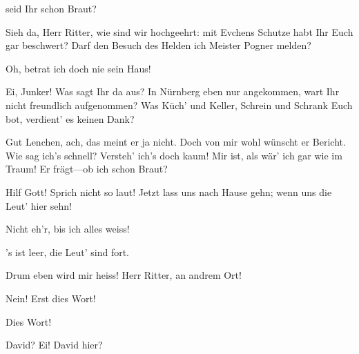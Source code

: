 \begin{drama}

seid Ihr schon Braut?

\Magdalenespeaks


Sieh da, Herr Ritter,
wie sind wir hochgeehrt:
mit Evchens Schutze habt Ihr Euch gar beschwert?
Darf den Besuch des Helden
ich Meister Pogner melden?

\Waltherspeaks
{}

Oh, betrat ich doch nie sein Haus!

\Magdalenespeaks
Ei, Junker! Was sagt Ihr da aus?
In Nürnberg eben nur angekommen,
wart Ihr nicht freundlich aufgenommen?
Was Küch' und Keller, Schrein und Schrank
Euch bot, verdient' es keinen Dank?

\Evaspeaks

Gut Lenchen, ach, das meint er ja nicht.
Doch von mir wohl wünscht er Bericht.
Wie sag ich's schnell? Versteh' ich's doch kaum!
Mir ist, als wär' ich gar wie im Traum!
Er frägt---ob ich schon Braut?

\Magdalenespeaks
{}

Hilf Gott! Sprich nicht so laut!
Jetzt lass uns nach Hause gehn;
wenn uns die Leut' hier sehn!

\Waltherspeaks

Nicht eh'r, bis ich alles weiss!

\Evaspeaks
{}

's ist leer, die Leut' sind fort.

\Magdalenespeaks
Drum eben wird mir heiss!
Herr Ritter, an andrem Ort!


\Waltherspeaks


Nein! Erst dies Wort!

\Evaspeaks


Dies Wort!

\Magdalenespeaks
{}

David? Ei! David hier?




\end{drama}
